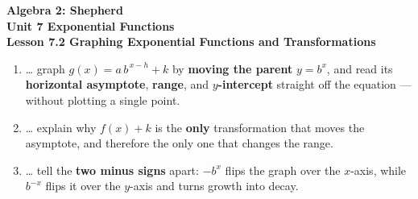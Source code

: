 \documentclass[10pt]{article}
\begin{document}
\vspace{-0.8in}

\begin{center}
  {\color{white}\textbf{\LARGE Algebra 2: Shepherd}}\\[4pt]
  {\color{forestmid}\large\textbf{Unit 7 \quad Exponential Functions}}\\[6pt]
  {\color{white}\textbf{\large Lesson 7.2 \quad Graphing Exponential Functions and Transformations}}
\end{center}

\vspace{0.22in}
\namedateperiod
\vspace{0.18in}

\begin{learningtargetbox}
\small
\begin{enumerate}[leftmargin=1.5em, itemsep=5pt]
  \item \ldots{} graph $g(x)=a\,b^{\,x-h}+k$ by \textbf{moving the parent} $y=b^{x}$, and read its \textbf{horizontal asymptote}, \textbf{range}, and \textbf{$y$-intercept} straight off the equation --- without plotting a single point.
  \item \ldots{} explain why $f(x)+k$ is the \textbf{only} transformation that moves the asymptote, and therefore the only one that changes the range.
  \item \ldots{} tell the \textbf{two minus signs} apart: $-b^{x}$ flips the graph over the $x$-axis, while $b^{-x}$ flips it over the $y$-axis and turns growth into decay.
\end{enumerate}
\end{learningtargetbox}

\vspace{0.14in}
\end{document}
